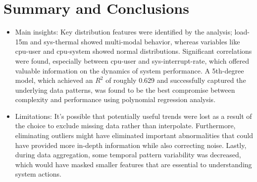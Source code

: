\documentclass[11pt]{article}
\begin{document}
	\section{Summary and Conclusions}
	\begin{itemize}
		\item Main insights: Key distribution features were identified by the analysis; load-15m and sys-thermal showed multi-modal behavior, whereas variables like cpu-user and cpu-system showed normal distributions. Significant correlations were found, especially between cpu-user and sys-interrupt-rate, which offered valuable information on the dynamics of system performance. A 5th-degree model, which achieved an $R^2$ of roughly 0.629 and successfully captured the underlying data patterns, was found to be the best compromise between complexity and performance using polynomial regression analysis.
		\item Limitations: It's possible that potentially useful trends were lost as a result of the choice to exclude missing data rather than interpolate. Furthermore, eliminating outliers might have eliminated important abnormalities that could have provided more in-depth information while also correcting noise. Lastly, during data aggregation, some temporal pattern variability was decreased, which would have masked smaller features that are essential to understanding system actions.
		
	\end{itemize}
	
	
\end{document}
